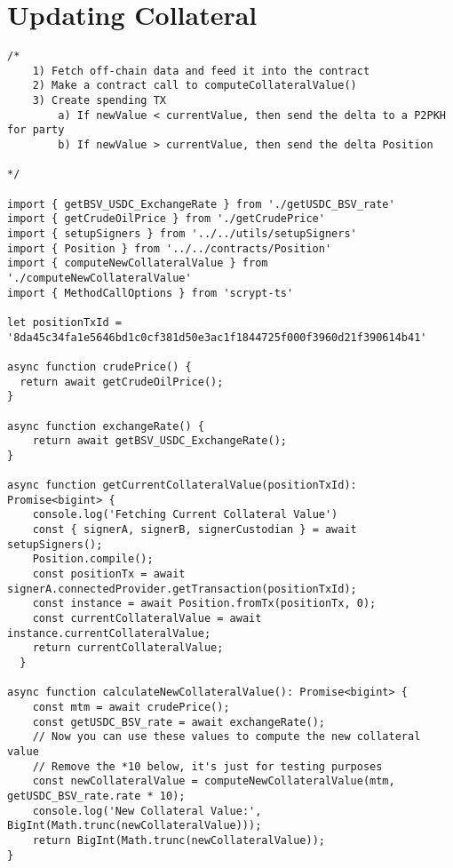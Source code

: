 \section{Updating Collateral}
\label{app:updating_collateral}

\begin{lstlisting}[style=htmlcssjs, caption=Moving funds beteween Collateral Position and Parties' Balances based on updated collateral valuation]
/*
    1) Fetch off-chain data and feed it into the contract
    2) Make a contract call to computeCollateralValue()
    3) Create spending TX
        a) If newValue < currentValue, then send the delta to a P2PKH for party 
        b) If newValue > currentValue, then send the delta Position

*/

import { getBSV_USDC_ExchangeRate } from './getUSDC_BSV_rate'
import { getCrudeOilPrice } from './getCrudePrice'
import { setupSigners } from '../../utils/setupSigners'
import { Position } from '../../contracts/Position'
import { computeNewCollateralValue } from './computeNewCollateralValue'
import { MethodCallOptions } from 'scrypt-ts'

let positionTxId = '8da45c34fa1e5646bd1c0cf381d50e3ac1f1844725f000f3960d21f390614b41'

async function crudePrice() {
  return await getCrudeOilPrice();
}

async function exchangeRate() {
    return await getBSV_USDC_ExchangeRate();
}

async function getCurrentCollateralValue(positionTxId): Promise<bigint> {
    console.log('Fetching Current Collateral Value')
    const { signerA, signerB, signerCustodian } = await setupSigners();
    Position.compile();
    const positionTx = await signerA.connectedProvider.getTransaction(positionTxId);
    const instance = await Position.fromTx(positionTx, 0);
    const currentCollateralValue = await instance.currentCollateralValue;
    return currentCollateralValue;
  }

async function calculateNewCollateralValue(): Promise<bigint> {
    const mtm = await crudePrice();
    const getUSDC_BSV_rate = await exchangeRate();
    // Now you can use these values to compute the new collateral value
    // Remove the *10 below, it's just for testing purposes
    const newCollateralValue = computeNewCollateralValue(mtm, getUSDC_BSV_rate.rate * 10);
    console.log('New Collateral Value:', BigInt(Math.trunc(newCollateralValue)));
    return BigInt(Math.trunc(newCollateralValue));
}


\end{lstlisting}
